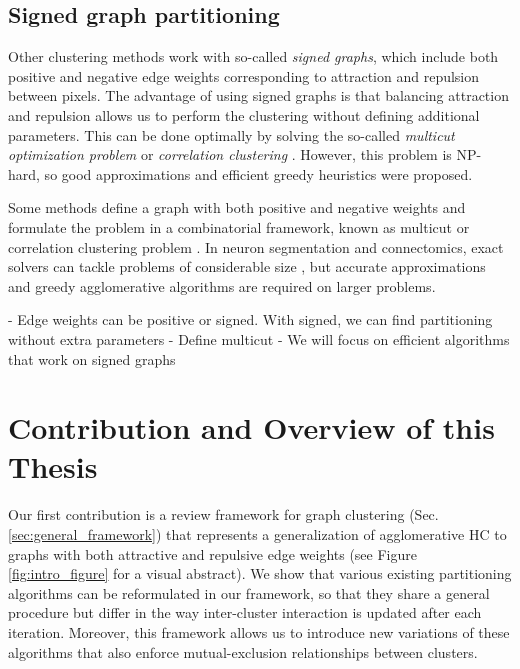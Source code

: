 \subsection{Signed graph partitioning}

Other clustering methods work with so-called \emph{signed graphs}, which include both positive and negative edge weights corresponding to attraction and repulsion between pixels. The advantage of using signed graphs is that balancing attraction and repulsion allows us to perform the clustering without defining additional parameters. This can be done optimally by solving the so-called \emph{multicut optimization problem} or \emph{correlation clustering} \cite{kappes2011globally,chopra1991multiway}. However, this problem is NP-hard, so good approximations \cite{yarkony2012fast,pape2017solving} and efficient greedy heuristics \cite{levinkov2017comparative,wolf2018mutex} were proposed.

Some methods define a graph with both positive and negative weights and formulate the problem in a combinatorial framework, known as multicut or correlation clustering problem \cite{chopra1991multiway}. 
In neuron segmentation and connectomics, exact solvers can tackle problems of considerable size \cite{andres2012globally}, but accurate approximations \cite{pape2017solving,yarkony2012fast} and greedy agglomerative algorithms \cite{levinkov2017comparative,wolf2019mutex,bailoni2019generalized} are required on larger problems.




- Edge weights can be positive or signed. With signed, we can find partitioning without extra parameters
- Define multicut
- We will focus on efficient algorithms that work on signed graphs


\section{Contribution and Overview of this Thesis}

Our first contribution is a review framework for graph clustering (Sec. \ref{sec:general_framework}) that represents a generalization of agglomerative HC to graphs with both attractive and repulsive edge weights (see Figure \ref{fig:intro_figure} for a visual abstract). 
We show that various existing partitioning algorithms \cite{levinkov2017comparative,wolf2018mutex,kardoostsolving,lance1967general} can be reformulated in our framework, so that they share a general procedure but differ in the way inter-cluster interaction is updated after each iteration. Moreover, this framework allows us to introduce new variations of these algorithms that also enforce mutual-exclusion relationships between clusters.  

